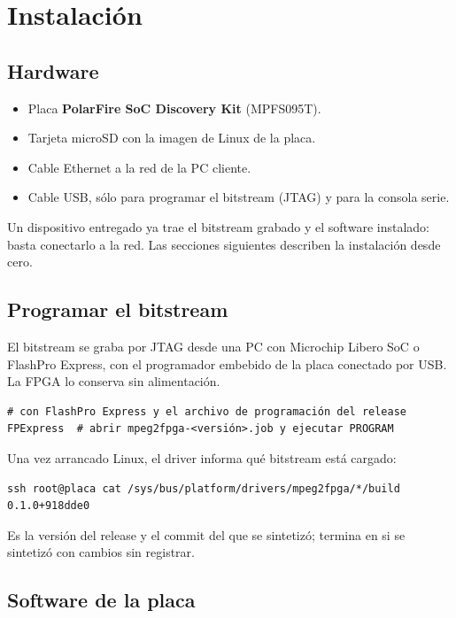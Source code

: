 \chapter{Instalación}

\section{Hardware}

\begin{itemize}
  \item Placa \textbf{PolarFire SoC Discovery Kit} (MPFS095T).
  \item Tarjeta microSD con la imagen de Linux de la placa.
  \item Cable Ethernet a la red de la PC cliente.
  \item Cable USB, sólo para programar el bitstream (JTAG) y para la consola
    serie.
\end{itemize}

Un dispositivo entregado ya trae el bitstream grabado y el software
instalado: basta conectarlo a la red. Las secciones siguientes describen la
instalación desde cero.

\section{Programar el bitstream}

El bitstream se graba por JTAG desde una PC con Microchip Libero SoC o
FlashPro Express, con el programador embebido de la placa conectado por USB.
La FPGA lo conserva sin alimentación.

\begin{lstlisting}[language=shell]
# con FlashPro Express y el archivo de programación del release
FPExpress  # abrir mpeg2fpga-<versión>.job y ejecutar PROGRAM
\end{lstlisting}

Una vez arrancado Linux, el driver informa qué bitstream está cargado:

\begin{lstlisting}[language=shell]
ssh root@placa cat /sys/bus/platform/drivers/mpeg2fpga/*/build
0.1.0+918dde0
\end{lstlisting}

Es la versión del release y el commit del que se sintetizó; termina en
 si se sintetizó con cambios sin registrar.

\section{Software de la placa}

